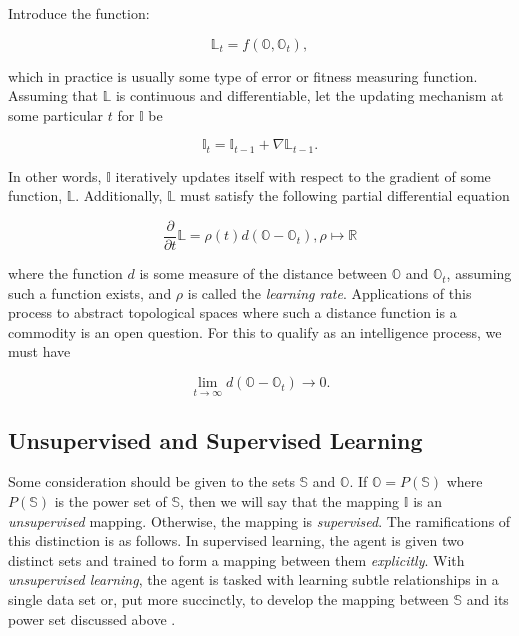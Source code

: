 \documentclass[english]{article}
\begin{document}
Introduce the function:

\begin{equation}
\mathbb{L}_{t}=f\left(\mathbb{O},\mathbb{\mathbb{O}}_{t}\right),
\end{equation}


which in practice is usually some type of error or fitness measuring
function. Assuming that $\mathbb{L}$ is continuous and differentiable,
let the updating mechanism at some particular $t$ for $\mathbb{I}$
be

\begin{equation}
\mathbb{I}_{t}=\mathbb{I}_{t-1}+\nabla\mathbb{L}_{t-1}.
\end{equation}


In other words, $\mathbb{I}$ iteratively updates itself with respect
to the gradient of some function, $\mathbb{L}$. Additionally, $\mathbb{L}$
must satisfy the following partial differential equation

\begin{equation}
\frac{\partial}{\partial t}\mathbb{L=}\rho(t)d\left(\mathbb{O}-\mathbb{\mathbb{O}}_{t}\right),\rho\mapsto\mathbb{R}
\end{equation}


where the function $d$ is some measure of the distance between $\mathbb{O}$
and $\mathbb{O}_{t}$, assuming such a function exists, and $\rho$
is called the \emph{learning rate}. Applications of this process to
abstract topological spaces where such a distance function is a commodity
is an open question. For this to qualify as an intelligence process,
we must have

\begin{equation}
\lim_{t\rightarrow\infty}d\left(\mathbb{O}-\mathbb{\mathbb{O}}_{t}\right)\rightarrow0.
\end{equation}



\subsection{Unsupervised and Supervised Learning\label{sub:Remarks}}

Some consideration should be given to the sets $\mathbb{S}$ and $\mathbb{O}$.
If $\mathbb{O}=P(\mathbb{S})$ where $P(\mathbb{S})$ is the power
set of $\mathbb{S}$, then we will say that the mapping $\mathbb{I}$
is an \emph{unsupervised} mapping. Otherwise, the mapping is \emph{supervised}.
The ramifications of this distinction is as follows. In supervised
learning, the agent is given two distinct sets and trained to form
a mapping between them \emph{explicitly}. With \emph{unsupervised
learning}, the agent is tasked with learning subtle relationships
in a single data set or, put more succinctly, to develop the mapping
between $\mathbb{S}$ and its power set discussed above \cite{jon,rus}.
\end{document}
